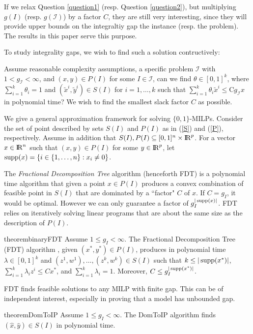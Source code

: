 If we relax Question \ref{question1} (resp. Question \ref{question2}), but multiplying $g(I)$ (resp. $g(\mathcal{I})$) by a factor $C$, they are still very interesting, since they will provide upper bounds on the integraltiy gap the instance (resp. the problem). The results in this paper serve this purpose.
\fi

To study integrality gaps, we wish to find such a solution contructively:
\begin{question}\label{question2}
	Assume reasonable complexity assumptions, a specific problem $\mathcal{I}$ with  $1<g_{\mathcal{I}}<\infty$, and $(x,y)\in P(I)$ for some $I\in \mathcal{I}$, can we find $\theta \in [0,1]^k$, where $\sum_{i=1}^{k}\theta_i =1$ and $(\tilde{x}^i,\tilde{y}^i)\in S(I)$ for $i=1,\ldots,k$ such that $\sum_{i=1}^{k}\theta_i \tilde{x}^i\leq $C$ g_{\mathcal{I}}x$ in polynomial time? We wish to find the smallest slack factor $C$ as possible.
\end{question}

We give a general approximation framework for solving $\{0,1\}$-MILPs.  Consider the set of point described by sets $S(I)$ and $P(I)$ as in (\ref{S}) and (\ref{P}), respectively. Assume in addition that $S(I),P(I)\subseteq [0,1]^n\times {\rm I\!R}^p$. For a vector $x\in {\rm I\!R}^n$ such that $(x,y)\in P(I)$ for some $y\in {\rm I\!R}^p$, let $\operatorname{supp}(x)= \{i \in \{1,\ldots,n\}: x_i \neq 0\}$. 


The \textit{Fractional Decomposition Tree} algorithm (henceforth FDT) is a polynomial time algorithm that given a point $x\in P(I)$ produces a convex combination of feasible point in $S(I)$ that are dominated by a ``factor" $C$ of $x$. If $C = g_I$, it would be optimal. However we can only guarantee a factor of $g_I^{|\operatorname{supp}(x)|}$. FDT relies on iteratively solving linear programs that are about the same size as the description of $P(I)$.

\begin{restatable}{theorem}{binaryFDT}
	\label{binaryFDT}
	Assume $1\leq g_I 	<\infty$. 	
	The Fractional Decomposition Tree (FDT) algorithm , given $(x^*,y^*)\in P(I)$, produces in polynomial time $\lambda\in [0,1]^k$ and $(z^1,w^1),\ldots,(z^k,w^k) \in S(I)$ such that $k\leq |\operatorname{supp}(x^*)|$, $\sum_{i=1}^{k}\lambda_i z^i\leq Cx^*$, and $\sum_{i=1}^{k}\lambda_i = 1$. Moreover, $C\leq g_I^{|\operatorname{supp}(x^*)|}$.
\end{restatable}

FDT finds feasible solutions to any MILP with finite gap. This can be of independent interest, especially in proving that a model has unbounded gap.
\begin{restatable}{theorem}{DomToIP}
	\label{domtoIP}
	Assume $1\leq g_I < \infty$. The DomToIP algorithm finds $(\hat{x},\hat{y})\in S(I)$ in polynomial time.
\end{restatable}

